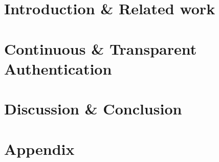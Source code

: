 \documentclass[ 
    openright,
    titlepage,
    numbers=noenddot,
    headinclude,
    cleardoublepage=empty,
    abstractoff, %
    BCOR=5mm,
    paper=a4,f
    ontsize=11pt,%
    american,%
    twoside
    ]{scrreprt}
\begin{document}
\frenchspacing
\raggedbottom
{} %
\renewcommand*{\bibname}{References}
\pagestyle{plain}


%


\cleardoublepage
\cleardoublepage
\pagestyle{scrheadings}
\cleardoublepage
\cleardoublepage{}
\cleardoublepage
\part{Introduction \& Related work}




\cleardoublepage
\part{Continuous \& Transparent Authentication}






\cleardoublepage
\part{Discussion \& Conclusion}




\cleardoublepage

\appendix
\cleardoublepage
\part{Appendix}

\cleardoublepage
\end{document}
